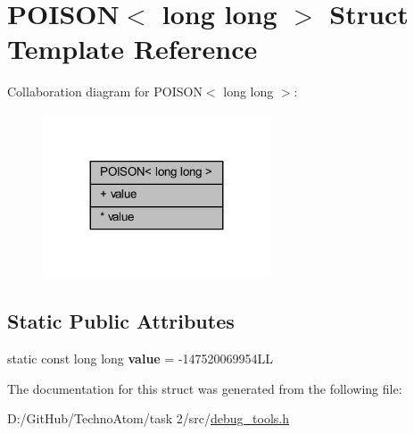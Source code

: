 \hypertarget{struct_p_o_i_s_o_n_3_01long_01long_01_4}{}\section{P\+O\+I\+S\+ON$<$ long long $>$ Struct Template Reference}
\label{struct_p_o_i_s_o_n_3_01long_01long_01_4}


Collaboration diagram for P\+O\+I\+S\+ON$<$ long long $>$\+:
\nopagebreak
\begin{figure}[H]
\begin{center}
\leavevmode
\includegraphics[width=191pt]{struct_p_o_i_s_o_n_3_01long_01long_01_4__coll__graph}
\end{center}
\end{figure}
\subsection*{Static Public Attributes}
\textbf{ }\par
\begin{DoxyCompactItemize}
\item 
\mbox{\label{struct_p_o_i_s_o_n_3_01long_01long_01_4_a92c6c904c4763d3f39cd904cada4ec44}} 
static const long long {\bfseries value} = -\/147520069954\+LL
\end{DoxyCompactItemize}



The documentation for this struct was generated from the following file\+:\begin{DoxyCompactItemize}
\item 
D\+:/\+Git\+Hub/\+Techno\+Atom/task 2/src/\hyperlink{debug__tools_8h}{debug\+\_\+tools.\+h}\end{DoxyCompactItemize}
